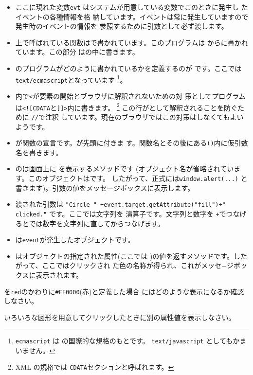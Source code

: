 \begin{itemize}
 \item ここに現れた変数\texttt{evt}
はシステムが用意している変数でこのときに発生し
 たイベントの各種情報を格
 納しています。イベントは常に発生していますので発生時のイベントの情報を
 参照するために引数として必ず渡します。
 \item 上で呼ばれている関数は\JS で書かれています。このプログラムは
       からに書かれています。この部分
       はの中に書きます。
 \item {}のプログラムがどのように書かれているかを定義するのが
 です。ここでは\texttt{text/ecmascript}となっています
       \footnote{\texttt{ecmascript} は \JS の国際的な規格のもとです。
       \texttt{text/javascript} としてもかまいません。}。
 \item \JS 内で\texttt{<}が要素の開始とブラウザに解釈されないための対
       策としてプログラムは\verb+<![CDATA+と\verb+]]>+内に書きます。
       \footnote{XML の規格では \texttt{CDATA}セクションと呼ばれます。}
       この行が\JS として解釈されることを防ぐために \texttt{//}で注釈
       しています。現在のブラウザではこの対策はしなくてもよいようです。 
 \item {}が関数の宣言です。が先頭に付きま
       す。関数名とその後にある\texttt{()}内に仮引数名を書きます。
 \item {}のは画面上に
       を表示するメソッドです
 (オブジェクト名が省略されています。このオブジェクトはです。
       したがって、正式には\texttt{window.alert(...)}
 と書きます)。引数の値をメッセージボックスに表示します。
 \item 渡された引数は
       \verb#"Circle " +event.target.getAttribute("fill")+" clicked."#
      です。ここで\ElmJ{\texttt{+}}は文字列を
       演算子です。文字列と数字を
       \texttt{+}でつなげると\JS では数字を文字列に直してからつなげます。
 \item {}は\texttt{event}が発生したオブジェクトです。
 \item {}はオブジェクトの指定された属性(ここでは
 )の値を返すメソッドです。したがって、ここではクリックされ
 た色の名称が得られ、これがメッセ−ジボックスに表示されます。
\end{itemize}
\begin{Problem}\upshape
 を\texttt{\upshape red}のかわりに\verb+#FF0000+(赤)と定義した場合
 にはどのような表示になるか確認しなさい。
\end{Problem}
\begin{Problem}
 いろいろな図形を用意してクリックしたときに別の属性値を表示しなさい。
\end{Problem}

